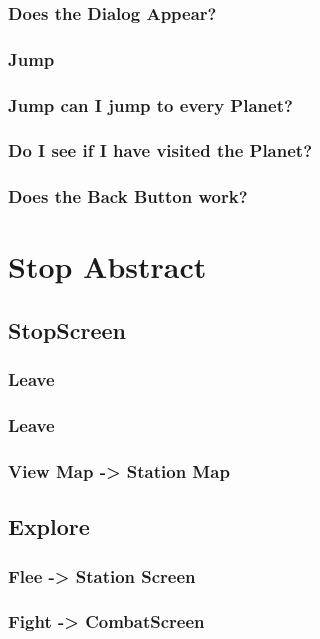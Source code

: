 \documentclass[11pt]{article}
\begin{document}
\subsubsection{Does the Dialog Appear?}
\subsubsection{ Jump}
\subsubsection{Jump can I jump to every Planet?}
\subsubsection{Do I see if I have visited the Planet?}
\subsubsection{ Does the Back Button work?}


\section{Stop Abstract}
\label{sec:org3bde3ec}

\subsection{StopScreen}

\subsubsection{Leave}

\subsubsection{Leave}
\subsubsection{View Map -> Station Map}

\subsection{Explore}
\subsubsection{Flee -> Station Screen}
\subsubsection{Fight -> CombatScreen}
\end{document}
